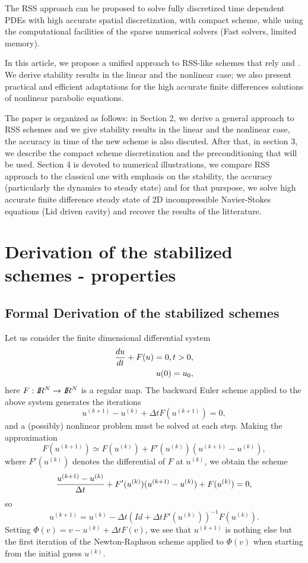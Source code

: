 {The RSS approach can be proposed to solve fully discretized time dependent PDEs with high accurate spatial discretization, with compact scheme, while using the computational facilities of the sparse numerical solvers (Fast solvers, limited memory).

In this article, we propose a unified approach to RSS-like schemes that rely \cite{AverbuchCohenIsraeli} and \cite{CDGT}. We derive stability results in the linear and the nonlinear case;  we also present practical and efficient adaptations for the high accurate finite differences solutions of nonlinear parabolic equations.


The paper is organized as follows:
in Section 2,  we derive a general approach to RSS schemes and we give stability results in the linear and the nonlinear case,  the accuracy in time of the new scheme is also discuted. After that, in section 3, we describe the compact scheme discretization and the preconditioning that will be used. Section 4 is devoted to numerical illustrations, we compare RSS approach to the classical one with emphasis on the stability, the accuracy (particularly the dynamics to steady state) and for that purspose, we solve high accurate finite difference steady state of 2D incompressible Navier-Stokes equations (Lid driven cavity) and recover the results of the litterature.
\section{Derivation of the stabilized schemes - properties}
\subsection{Formal Derivation of the stabilized schemes}
Let us consider the finite dimensional differential system
\begin{eqnarray}
\frac{\textstyle du} {\textstyle dt}+F(u)=0, t>0,\\
u(0)=u_0,
\end{eqnarray}
here $F : I\!\!R^N\rightarrow I\!\!R^N$ is a regular map. The backward Euler
scheme applied to the above system generates the iterations
$$
u^{(k+1)}-u^{(k)}+\Delta tF(u^{(k+1)})=0,
$$
and a (possibly) nonlinear problem must be solved at each step. Making
the approximation
$$
F(u^{(k+1)})\simeq F(u^{(k)}) +F'(u^{(k)})(u^{(k+1)}-u^{(k)}),
$$
where $F'(u^{(k)})$ denotes the differential of $F$ at $u^{(k)}$, we obtain the scheme
$$
\frac{\textstyle u^{(k+1)}-u^{(k)}} {\textstyle \Delta t} + F'(u^{(k)})(u^{(k+1)}-u^{(k)})
+F(u^{(k)})=0,
$$
so
$$
u^{(k+1)}=u^{(k)}-\Delta t(Id +\Delta tF'(u^{(k)}))^{-1}F(u^{(k)}).
$$
Setting $\Phi(v)=v-u^{(k)}+\Delta tF(v)$, we see that $u^{(k+1)}$
is nothing else but the first iteration of the Newton-Raphson scheme
applied to $\Phi(v)$ when starting from the initial guess $u^{(k)}$.

}
